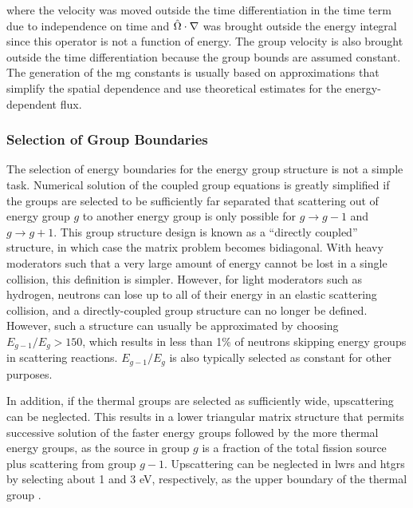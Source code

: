 where the velocity was moved outside the time differentiation in the time term due to independence on time and \(\hat{\Omega}\cdot\nabla\) was brought outside the energy integral since this operator is not a function of energy. The group velocity is also brought outside the time differentiation because the group bounds are assumed constant. The generation of the \gls{mg} constants is usually based on approximations that simplify the spatial dependence and use theoretical estimates for the energy-dependent flux.

\subsubsection{Selection of Group Boundaries}

The selection of energy boundaries for the energy group structure is not a simple task. Numerical solution of the coupled group equations is greatly simplified if the groups are selected to be sufficiently far separated that scattering out of energy group \(g\) to another energy group is only possible for \(g\rightarrow g-1\) and \(g\rightarrow g+1\). This group structure design is known as a ``directly coupled'' structure, in which case the matrix problem becomes bidiagonal. With heavy moderators such that a very large amount of energy cannot be lost in a single collision, this definition is simpler. However, for light moderators such as hydrogen, neutrons can lose up to all of their energy in an elastic scattering collision, and a directly-coupled group structure can no longer be defined. However, such a structure can usually be approximated by choosing \(E_{g-1}/E_g>150\), which results in less than 1\% of neutrons skipping energy groups in scattering reactions. \(E_{g-1}/E_g\) is also typically selected as constant for other purposes.

In addition, if the thermal groups are selected as sufficiently wide, upscattering can be neglected. This results in a lower triangular matrix structure that permits successive solution of the faster energy groups followed by the more thermal energy groups, as the source in group \(g\) is a fraction of the total fission source plus scattering from group \(g-1\). Upscattering can be neglected in \glspl{lwr} and \glspl{htgr} by selecting about 1 and 3 eV, respectively, as the upper boundary of the thermal group \cite{duderstadt}.
